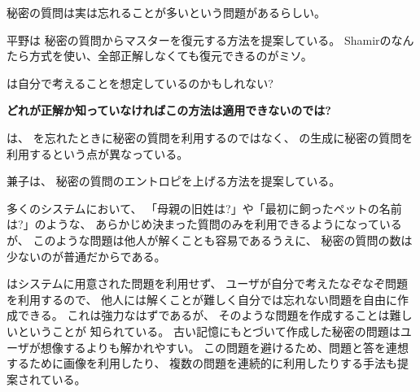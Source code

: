 \documentclass[twoside]{wiss}
\begin{document}
秘密の質問は実は忘れることが多いという問題があるらしい。

平野\cite{平野亮:2011-11-07}は
秘密の質問からマスター{\PW}を復元する方法を提案している。
Shamirのなんたら方式を使い、全部正解しなくても復元できるのがミソ。

{\PW}は自分で考えることを想定しているのかもしれない?

\textbf{どれが正解か知っていなければこの方法は適用できないのでは?}


{\EP}は、
{\PW}を忘れたときに秘密の質問を利用するのではなく、
{\PW}の生成に秘密の質問を利用するという点が異なっている。

兼子は、
秘密の質問のエントロピを上げる方法を提案している\cite{Kaneko}。

多くのシステムにおいて、
「母親の旧姓は?」や「最初に飼ったペットの名前は?」のような、
あらかじめ決まった質問のみを利用できるようになっているが、
このような問題は他人が解くことも容易であるうえに、
秘密の質問の数は少ないのが普通だからである\cite{Rabkin:2008:PKQ:1408664.1408667}。

{\EP}はシステムに用意された問題を利用せず、
ユーザが自分で考えたなぞなぞ問題を利用するので、
他人には解くことが難しく自分では忘れない問題を自由に作成できる。
これは強力なはずであるが、
そのような問題を作成することは難しいということが
知られている\cite{Just:2009:PCC:1572532.1572543}\cite{Schechter:2009:NSM:1607723.1608145}。
%
%
%
古い記憶にもとづいて作成した秘密の問題はユーザが想像するよりも解かれやすい。
この問題を避けるため、問題と答を連想するために画像を利用したり、
複数の問題を連続的に利用したりする手法も提案されている\cite{Renaud:2010:PQE:2146303.2146318}。





\end{document}

